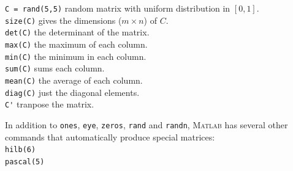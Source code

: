 \verb&C = rand(5,5)& \dotfill random matrix with uniform
         distribution in $[0,1]$.\\
\verb&size(C)& \dotfill gives the dimensions ($m\times n$) of $C$.\\
\verb&det(C)&   \dotfill the determinant of the matrix.\\
\verb&max(C)&   \dotfill the maximum of each column.\\
\verb&min(C)&   \dotfill the minimum in each column.\\
\verb&sum(C)&   \dotfill sums each column.\\
\verb&mean(C)&   \dotfill the average of each column.\\
\verb&diag(C)&   \dotfill just the diagonal elements.\\
\verb&C'&   \dotfill tranpose the matrix.

In addition to \verb&ones&, \verb&eye&, \verb&zeros&, \verb&rand& and
\verb&randn&,  \textsc{Matlab} has several other commands that
automatically produce special matrices:
\\
\verb&hilb(6)&\\
\verb&pascal(5)&


\newpage
